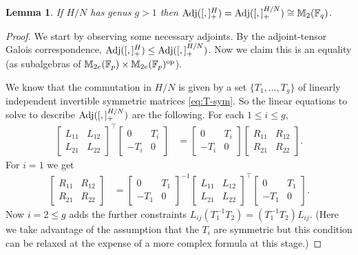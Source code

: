 \documentclass{toc}
\numberwithin{equation}{section}
\theoremstyle{plain}       %
\newtheorem{lem}[equation]{Lemma}
\theoremstyle{remark}
\theoremstyle{definition}
\numberwithin{figure}{section}
\numberwithin{table}{section}
\newcommand{\bbF}{\mathbb{F}}  %
\begin{document}
\begin{lem}\label{lem:adj}
If $H/N$ has genus $g>1$ then ${\rm Adj}([,]_+^H)={\rm Adj}([,]_+^{H/N})\cong
\mathbb{M}_2(\bbF_q)$.
\end{lem}
\begin{proof}
We start by observing some necessary adjoints. By the adjoint-tensor Galois
correspondence, ${\rm Adj}([,]_+^H)\leq {\rm Adj}([,]_+^{H/N})$.  Now we claim
this is an equality (as subalgebras of $\mathbb{M}_{2e}(\bbF_p)\times
\mathbb{M}_{2e}(\bbF_p)^{\rm op}$).


We know that the commutation in $H/N$ is given by a set $\{T_1,\dots,T_g\}$ of
linearly independent invertible symmetric matrices \eqref{eq:T-sym}.  So the
linear equations to solve to describe ${\rm Adj}([,]_+^{H/N})$ are the
following.  For each $1\leq i\leq g$,
\begin{align*}
	\begin{bmatrix}
		L_{11} & L_{12}\\ 
		L_{21} & L_{22}
	\end{bmatrix}^{\top}
	\begin{bmatrix}
	0 & T_i\\
	-T_i & 0 
	\end{bmatrix}
	& =
	\begin{bmatrix}
	0 & T_i\\
	-T_i & 0 
	\end{bmatrix}
	\begin{bmatrix}
		R_{11} & R_{12}\\ 
		R_{21} & R_{22}
	\end{bmatrix}.
\end{align*}
For $i=1$ we get 
\begin{align*}
	\begin{bmatrix}
		R_{11} & R_{12} \\
		R_{21} & R_{22}
	\end{bmatrix}
	& =
	\begin{bmatrix}
		0 & T_1 \\
		-T_1 & 0
	\end{bmatrix}^{-1}
	\begin{bmatrix}
		L_{11} & L_{12}\\
		L_{21} & L_{22}
	\end{bmatrix}^{\top}
	\begin{bmatrix}
		0 & T_1 \\ -T_1 & 0
	\end{bmatrix}.
\end{align*}
Now $i=2\leq g$ adds the further constraints $L_{ij}(T_1^{-1}T_2)=(T_1^{-1}
T_2)L_{ij}$. (Here we take advantage of the assumption that the $T_i$ are
symmetric but this condition can be relaxed at the expense of a more complex
formula at this stage.)


\end{proof}
\end{document}
